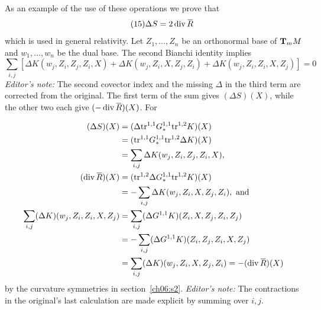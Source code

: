\documentclass[../main]{subfiles}
\begin{document}
As an example of the use of these operations we prove that 
\begin{equation}\tag{15}
\label{eqn:ch07.15}
\Delta S = 2 \Div \xoverline R
\end{equation}
which is used in general relativity. Let $Z_1, \ldots, Z_n$ be an orthonormal base of $\tangentspace M m$ and $w_1, \ldots, w_n$ be the dual base. The second Bianchi identity implies
\[
    \sum_{i, j} [\Delta K(w_j, Z_i, Z_j, Z_i, X) + \Delta K(w_j, Z_i, X, Z_j, Z_i) + \Delta K(w_j, Z_i, Z_i, X,Z_j)]=0
\]
\emph{Editor's note:} The second covector index and the missing $\Delta$ in the third term are corrected from the original.
The first term of the sum gives $(\Delta S)(X)$, while the other two each give $(-\Div \xoverline R)(X)$. For

\begin{align*}
(\Delta S)(X) & = (\Delta \tr^{1, 1} G_\ast^{1, 1} \tr^{1, 2} K)(X) \\ & = (\tr^{1, 1}G_\ast^{1, 1} \tr^{1, 2} \Delta K)(X) \\ & = \sum_{i, j} \Delta K(w_j, Z_i, Z_j, Z_i, X),
\\
(\Div \xoverline R)(X) & = (\tr^{1, 2} \Delta G_\ast^{1, 1} \tr^{1, 2}K)(X) \\ & = -\sum_{i, j} \Delta K(w_j, Z_i, X, Z_j, Z_i), \text { and}
\\
\sum_{i,j}(\Delta K)(w_j,Z_i,Z_i,X,Z_j)
&=\sum_{i,j}(\Delta G^{1,1}K)(Z_i,X,Z_j,Z_i,Z_j)\\
&=-\sum_{i,j}(\Delta G^{1,1}K)(Z_i,Z_j,Z_i,X,Z_j)\\
&=\sum_{i,j}(\Delta K)(w_j,Z_i,X,Z_j,Z_i)
=-(\Div\xoverline R)(X)
\end{align*}
by the curvature symmetries in section~\ref{ch06:s2}. \emph{Editor's note:} The contractions in the original's last calculation are made explicit by summing over $i,j$.
\end{document}
